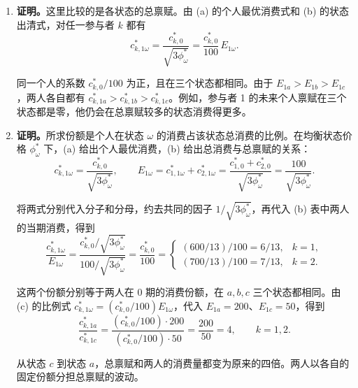 \begin{solution}[blank-type=manual,blank-vsep=9\baselineskip]
\begin{enumerate}[label=(\alph*)]
    各列的总消费都等于对应的总禀赋。按 (a) 的净交易公式，参与者 1 在三个状态的净买入量就是表中的未来消费量。参与者 2 在每个状态的净卖出量恰好与之相等，因此三个状态的证券市场也都出清。

    \item \textbf{证明。}这里比较的是各状态的总禀赋。由 (a) 的个人最优消费式和 (b) 的状态出清式，对任一参与者 $k$ 都有
    \[
       c_{k,1\omega}^*
       =\frac{c_{k,0}^*}{\sqrt{3\phi_\omega^*}}
       =\frac{c_{k,0}^*}{100}\,E_{1\omega}.
    \]

    同一个人的系数 $c_{k,0}^*/100$ 为正，且在三个状态都相同。由于 $E_{1a}>E_{1b}>E_{1c}$，两人各自都有 $c_{k,1a}^*>c_{k,1b}^*>c_{k,1c}^*$。例如，参与者 1 的未来个人禀赋在三个状态都是零，他仍会在总禀赋较多的状态消费得更多。

    \item \textbf{证明。}所求份额是个人在状态 $\omega$ 的消费占该状态总消费的比例。在均衡状态价格 $\phi_\omega^*$ 下，(a) 给出个人最优消费，(b) 给出总消费与总禀赋的关系：
    \[
       c_{k,1\omega}^*=\frac{c_{k,0}^*}{\sqrt{3\phi_\omega^*}},
       \qquad
       E_{1\omega}=c_{1,1\omega}^*+c_{2,1\omega}^*
       =\frac{c_{1,0}^*+c_{2,0}^*}{\sqrt{3\phi_\omega^*}}
       =\frac{100}{\sqrt{3\phi_\omega^*}}.
    \]

    将两式分别代入分子和分母，约去共同的因子 $1/\sqrt{3\phi_\omega^*}$，再代入 (b) 表中两人的当期消费，得到
    \[
       \frac{c_{k,1\omega}^*}{E_{1\omega}}
       =\frac{c_{k,0}^*/\sqrt{3\phi_\omega^*}}{100/\sqrt{3\phi_\omega^*}}
       =\frac{c_{k,0}^*}{100}
       =\begin{cases}
           (600/13)/100=6/13, & k=1,\\
           (700/13)/100=7/13, & k=2.
         \end{cases}
    \]

    这两个份额分别等于两人在 0 期的消费份额，在 $a,b,c$ 三个状态都相同。由 (c) 的比例式 $c_{k,1\omega}^*=(c_{k,0}^*/100)E_{1\omega}$，代入 $E_{1a}=200$、$E_{1c}=50$，得到
    \[
       \frac{c_{k,1a}^*}{c_{k,1c}^*}
       =\frac{(c_{k,0}^*/100)\cdot 200}{(c_{k,0}^*/100)\cdot 50}
       =\frac{200}{50}=4,\qquad k=1,2.
    \]

    从状态 $c$ 到状态 $a$，总禀赋和两人的消费量都变为原来的四倍。两人以各自的固定份额分担总禀赋的波动。
\end{enumerate}
\end{solution}
